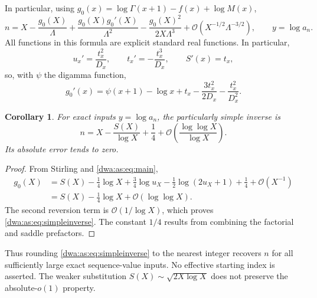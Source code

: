 \documentclass[11pt,letterpaper]{article}
\numberwithin{equation}{section}
\newtheorem{corollary}[theorem]{Corollary}
\theoremstyle{remark}
\newcommand{\OO}{\mathcal O}
\begin{document}
In particular, using $g_0(x)=\log\Gamma(x+1)-f(x)+\log M(x)$,
\begin{equation}\label{dwa:as:eq:tworevert}
 n=X-\frac{g_0(X)}\Lambda
 +\frac{g_0(X)g_0'(X)}{\Lambda^2}
 -\frac{g_0(X)^2}{2X\Lambda^3}
 +\OO\left(X^{-1/2}\Lambda^{-3/2}\right),\qquad y=\log a_n.
\end{equation}
All functions in this formula are explicit standard real functions. In particular,
\[
 u_x'=\frac{t_x^2}{D_x},\qquad t_x'=-\frac{t_x^3}{D_x},\qquad S'(x)=t_x,
\]
so, with $\psi$ the digamma function,
\begin{equation}\label{dwa:as:eq:gprime}
 g_0'(x)=\psi(x+1)-\log x+t_x-\frac{3t_x^2}{2D_x}-\frac{t_x^2}{D_x^2}.
\end{equation}

\begin{corollary}\label{dwa:as:cor:o1inverse}
For exact inputs $y=\log a_n$, the particularly simple inverse is
\begin{equation}\label{dwa:as:eq:simpleinverse}
 n=X-\frac{S(X)}{\log X}+\frac14
 +\OO\left(\frac{\log\log X}{\log X}\right).
\end{equation}
Its absolute error tends to zero.
\end{corollary}
\begin{proof}
From Stirling and \eqref{dwa:as:eq:main},
\begin{align*}
 g_0(X)&=S(X)-\frac14\log X
 +\frac34\log u_X-\frac12\log(2u_X+1)+\frac14+\OO(X^{-1})\\
 &=S(X)-\frac14\log X+\OO(\log\log X).
\end{align*}
The second reversion term is $\OO(1/\log X)$, which proves \eqref{dwa:as:eq:simpleinverse}. The constant $1/4$ results from combining the factorial and saddle prefactors.
\end{proof}
Thus rounding \eqref{dwa:as:eq:simpleinverse} to the nearest integer recovers $n$ for all sufficiently large exact sequence-value inputs. No effective starting index is asserted. The weaker substitution $S(X)\sim\sqrt{2X\log X}$ does not preserve the absolute-$o(1)$ property.
\end{document}
